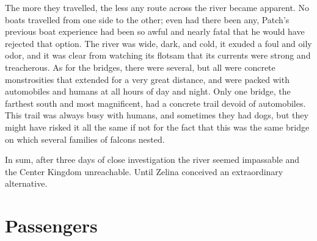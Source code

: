 \documentclass[12pt]{book}
\begin{document}
 The more they travelled, the less any route across the river became apparent. No boats travelled from one side to the other; even had there been any, Patch's previous boat experience had been so awful and nearly fatal that he would have rejected that option. The river was wide, dark, and cold, it exuded a foul and oily odor, and it was clear from watching its flotsam that its currents were strong and treacherous. As for the bridges, there were several, but all were concrete monstrosities that extended for a very great distance, and were packed with automobiles and humans at all hours of day and night. Only one bridge, the farthest south and most magnificent, had a concrete trail devoid of automobiles. This trail was always busy with humans, and sometimes they had dogs, but they might have risked it all the same %
 if not for the fact that this was the same bridge on which several families of falcons nested.\par
 In sum, after three days of close investigation the river seemed impassable and the Center Kingdom unreachable. Until Zelina conceived an extraordinary alternative.\par

\section{Passengers}
\end{document}
